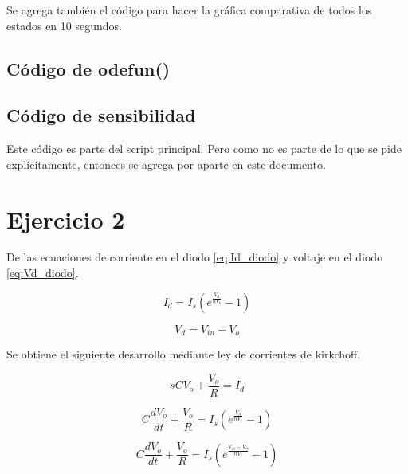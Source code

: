 \documentclass[12pt,letterpaper]{article}
\begin{document}
 Se agrega también el código para hacer la gráfica comparativa de todos los estados en 10 segundos.
  
 
\subsection{Código de odefun()}
 
\subsection{Código de sensibilidad}
 Este código es parte del script principal. Pero como no es parte de lo que se pide explícitamente, entonces se agrega por aparte en este documento.
  
 
  


\section{Ejercicio 2}

De las ecuaciones de corriente en el diodo \eqref{eq:Id_diodo} y voltaje en el diodo  \eqref{eq:Vd_diodo}.

\begin{equation}
\label{eq:Id_diodo}
I_d=I_s(e^{\frac{V_d}{nV_t}}-1)
\end{equation}



\begin{equation}\label{eq:Vd_diodo}
V_d= V_{in}-V_o
\end{equation}

Se obtiene el siguiente desarrollo mediante ley de corrientes de kirkchoff. 

\begin{equation}
sCV_o + \frac{V_o}{R} = I_d
\end{equation}

\begin{equation}
C \frac{dV_o}{dt} + \frac{V_o}{R} = I_s\left(e^{\frac{V_d}{nV_t}}-1\right)
\end{equation}

\begin{equation}
C \frac{dV_o}{dt} + \frac{V_o}{R} = I_s\left(e^{\frac{V_{in}-V_{o}}{nV_t}}-1\right)
\end{equation}
\end{document}
